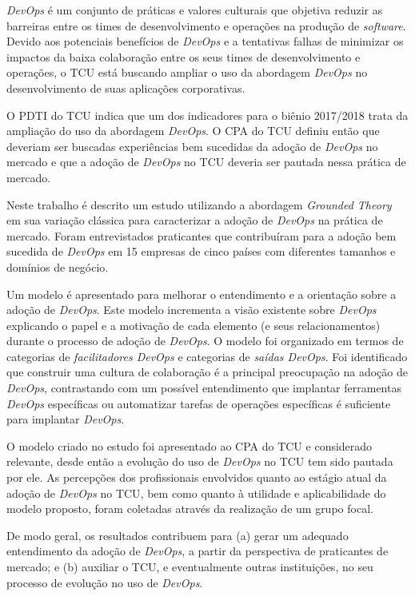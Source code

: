 \textit{DevOps} é um conjunto de práticas e valores culturais que objetiva
reduzir as barreiras entre os times de desenvolvimento e operações na produção
de \textit{software}. Devido aos potenciais benefícios de \textit{DevOps} e a
tentativas falhas de minimizar os impactos da baixa colaboração entre os seus
times de desenvolvimento e operações, o \acrshort{TCU} está buscando ampliar o
uso da abordagem \textit{DevOps} no desenvolvimento de suas aplicações corporativas.

O \acrfull{PDTI} do \acrshort{TCU} indica que um dos indicadores para o
biênio 2017/2018 trata da ampliação do uso da abordagem \textit{DevOps}. O
\acrfull{CPA} do \acrshort{TCU} definiu então que deveriam ser buscadas
experiências bem sucedidas da adoção de \textit{DevOps} no mercado e que a
adoção de \textit{DevOps} no TCU deveria ser pautada nessa prática de mercado.

Neste trabalho é descrito um estudo utilizando a abordagem \textit{Grounded
Theory} em sua variação clássica para caracterizar a adoção de \textit{DevOps}
na prática de mercado. Foram entrevistados praticantes que contribuíram para a
adoção bem sucedida de \textit{DevOps} em 15 empresas de cinco países com
diferentes tamanhos e domínios de negócio.

Um modelo é apresentado para melhorar o entendimento e a orientação sobre a
adoção de \textit{DevOps}. Este modelo incrementa a visão existente sobre
\textit{DevOps} explicando o papel e a motivação de cada elemento (e seus
relacionamentos) durante o processo de adoção de \textit{DevOps}. O modelo foi
organizado em termos de categorias de
\emph{facilitadores DevOps} e categorias de \emph{saídas DevOps}. Foi
identificado que construir uma cultura de colaboração é a principal preocupação
na adoção de \textit{DevOps}, contrastando com um possível entendimento que
implantar ferramentas \textit{DevOps} específicas ou automatizar tarefas de
operações específicas é suficiente para implantar \textit{DevOps}.

O modelo criado no estudo foi apresentado ao \acrshort{CPA} do \acrshort{TCU} e
considerado relevante, desde então a evolução do uso de \textit{DevOps} no
\acrshort{TCU} tem sido pautada por ele. As percepções dos profissionais
envolvidos quanto ao estágio atual da adoção de \textit{DevOps} no \acrshort{TCU},
bem como quanto à utilidade e aplicabilidade do modelo proposto, foram coletadas
através da realização de um grupo focal.

De modo geral, os resultados contribuem para (a) gerar um adequado entendimento
da adoção de \textit{DevOps}, a partir da perspectiva de praticantes de mercado;
e (b) auxiliar o \acrshort{TCU}, e eventualmente outras instituições, no seu
processo de evolução no uso de \textit{DevOps}.
